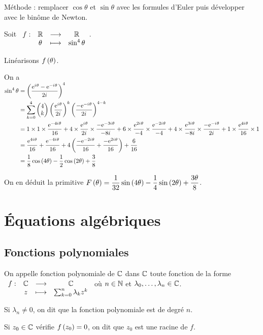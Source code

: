 Méthode : remplacer \(\cos\theta\) et \(\sin\theta\) avec les formules d'Euler puis développer avec le binôme de Newton.

\begin{ex}
Soit \(\fonction{f}{\R}{\R}{\theta}{\sin^4\theta}\).

Linéarisons \(f\paren{\theta}\).

On a \(\begin{aligned}[t]
\sin^4\theta&=\paren{\dfrac{\e{\i\theta}-\e{-\i\theta}}{2\i}}^4 \\
&=\sum_{k=0}^4\binom{k}{4}\paren{\dfrac{\e{\i\theta}}{2\i}}^k\paren{\dfrac{-\e{-\i\theta}}{2\i}}^{4-k} \\
&=1\times1\times\dfrac{\e{-4\i\theta}}{16}+4\times\dfrac{\e{\i\theta}}{2\i}\times\dfrac{-\e{-3\i\theta}}{-8\i}+6\times\dfrac{\e{2\i\theta}}{-4}\times\dfrac{\e{-2\i\theta}}{-4}+4\times\dfrac{\e{3\i\theta}}{-8\i}\times\dfrac{-\e{-\i\theta}}{2\i}+1\times\dfrac{\e{4\i\theta}}{16}\times1 \\
&=\dfrac{\e{4\i\theta}}{16}+\dfrac{\e{-4\i\theta}}{16}+4\paren{\dfrac{-\e{-2\i\theta}}{16}+\dfrac{-\e{2\i\theta}}{16}}+\dfrac{6}{16} \\
&=\dfrac{1}{8}\cos\paren{4\theta}-\dfrac{1}{2}\cos\paren{2\theta}+\dfrac{3}{8}
\end{aligned}\)

On en déduit la primitive \(F\paren{\theta}=\dfrac{1}{32}\sin\paren{4\theta}-\dfrac{1}{4}\sin\paren{2\theta}+\dfrac{3\theta}{8}\).
\end{ex}

\section{Équations algébriques}

\subsection{Fonctions polynomiales}

\begin{defi}
On appelle fonction polynomiale de \(\C\) dans \(\C\) toute fonction de la forme \(\fonction{f}{\C}{\C}{z}{\sum_{k=0}^n\lambda_kz^k}\) où \(n\in\N\) et \(\lambda_0,\dots,\lambda_n\in\C\).

Si \(\lambda_n\not=0\), on dit que la fonction polynomiale est de degré \(n\).

Si \(z_0\in\C\) vérifie \(f\paren{z_0}=0\), on dit que \(z_0\) est une racine de \(f\).
\end{defi}

